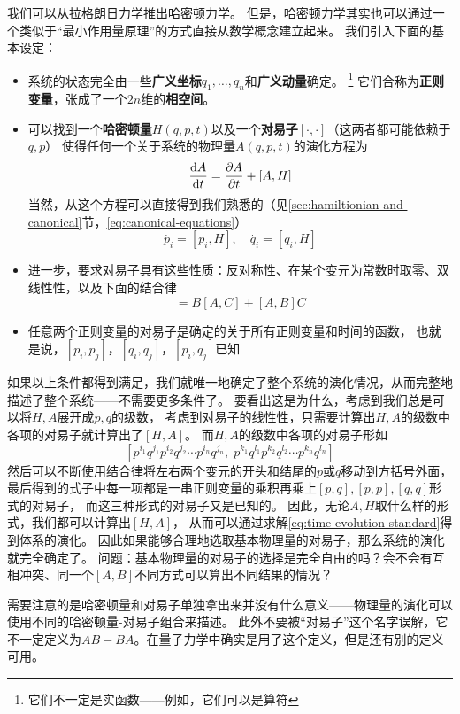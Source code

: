\documentclass[UTF8, a4paper]{ctexart}
\begin{document}
我们可以从拉格朗日力学推出哈密顿力学。
但是，哈密顿力学其实也可以通过一个类似于“最小作用量原理”的方式直接从数学概念建立起来。
我们引入下面的基本设定：
\begin{itemize}
    \item 系统的状态完全由一些\textbf{广义坐标}$q_1, \ldots, q_n$和\textbf{广义动量}确定。%
    \footnote{它们不一定是实函数——例如，它们可以是算符}%
    它们合称为\textbf{正则变量}，张成了一个$2n$维的\textbf{相空间}。
    \item 可以找到一个\textbf{哈密顿量}$H(q, p, t)$以及一个\textbf{对易子}$[\cdot, \cdot]$（这两者都可能依赖于$q,p$）
    使得任何一个关于系统的物理量$A(q, p, t)$的演化方程为
    \begin{equation}
        \dv{A}{t} = \pdv{A}{t} + [A, H]
        \label{eq:time-evolution-standard}
    \end{equation}
    当然，从这个方程可以直接得到我们熟悉的（见\ref{sec:hamiltionian-and-canonical}节，\eqref{eq:canonical-equations}）
    \[
        \dot{p_i} = [p_i, H], \quad \dot{q_i} = [q_i, H]
    \]
    \item 进一步，要求对易子具有这些性质：反对称性、在某个变元为常数时取零、双线性性，以及下面的结合律
    \begin{equation}
        [A, BC] = B[A, C] + [A, B]C
    \end{equation}
    \item 任意两个正则变量的对易子是确定的关于所有正则变量和时间的函数，
    也就是说，$[p_i, p_j]$，$[q_i, q_j]$，$[p_i, q_j]$已知
\end{itemize}

如果以上条件都得到满足，我们就唯一地确定了整个系统的演化情况，从而完整地描述了整个系统——不需要更多条件了。
要看出这是为什么，考虑到我们总是可以将$H,A$展开成$p, q$的级数，
考虑到对易子的线性性，只需要计算出$H, A$的级数中各项的对易子就计算出了$[H, A]$。
而$H, A$的级数中各项的对易子形如
\[
    [p^{i_1}q^{j_1} p^{i_2} q^{j_2} \cdots p^{i_n} q^{j_n},\; p^{k_1}q^{l_1} p^{k_2} q^{l_2} \cdots p^{k_n} q^{l_n}]
\]
然后可以不断使用结合律将左右两个变元的开头和结尾的$p$或$q$移动到方括号外面，
最后得到的式子中每一项都是一串正则变量的乘积再乘上$[p, q],[p, p], [q, q]$形式的对易子，
而这三种形式的对易子又是已知的。
因此，无论$A, H$取什么样的形式，我们都可以计算出$[H, A]$，
从而可以通过求解\eqref{eq:time-evolution-standard}得到体系的演化。
因此如果能够合理地选取基本物理量的对易子，那么系统的演化就完全确定了。
问题：基本物理量的对易子的选择是完全自由的吗？会不会有互相冲突、同一个$[A, B]$不同方式可以算出不同结果的情况？

需要注意的是哈密顿量和对易子单独拿出来并没有什么意义——物理量的演化可以使用不同的哈密顿量-对易子组合来描述。
此外不要被“对易子”这个名字误解，它不一定定义为$AB-BA$。在量子力学中确实是用了这个定义，但是还有别的定义可用。
\end{document}
